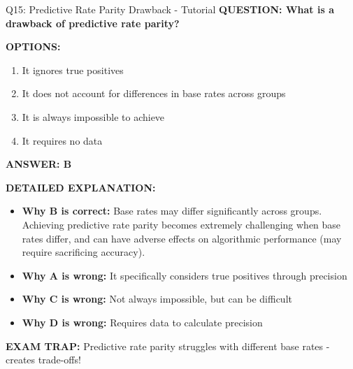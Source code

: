 \documentclass[8pt]{beamer}
\begin{document}
	\begin{frame}{Q15: Predictive Rate Parity Drawback - Tutorial}
		\fontsize{6.5}{7.5}\selectfont
		\textbf{QUESTION: What is a drawback of predictive rate parity?}
		
		\vspace{0.1cm}
		\textbf{OPTIONS:}
		\begin{enumerate}
			\item It ignores true positives
			\item It does not account for differences in base rates across groups
			\item It is always impossible to achieve
			\item It requires no data
		\end{enumerate}
		
		\vspace{0.1cm}
		\textcolor{myblue}{\textbf{ANSWER: B}}
		
		\vspace{0.1cm}
		\textbf{DETAILED EXPLANATION:}
		\begin{itemize}
			\item \textbf{Why B is correct:} Base rates may differ significantly across groups. Achieving predictive rate parity becomes extremely challenging when base rates differ, and can have adverse effects on algorithmic performance (may require sacrificing accuracy).
			\item \textbf{Why A is wrong:} It specifically considers true positives through precision
			\item \textbf{Why C is wrong:} Not always impossible, but can be difficult
			\item \textbf{Why D is wrong:} Requires data to calculate precision
		\end{itemize}
		
		\textcolor{myred}{\textbf{EXAM TRAP:}} Predictive rate parity struggles with \textcolor{myblue}{different base rates} - creates trade-offs!
	\end{frame}
	
\end{document}
